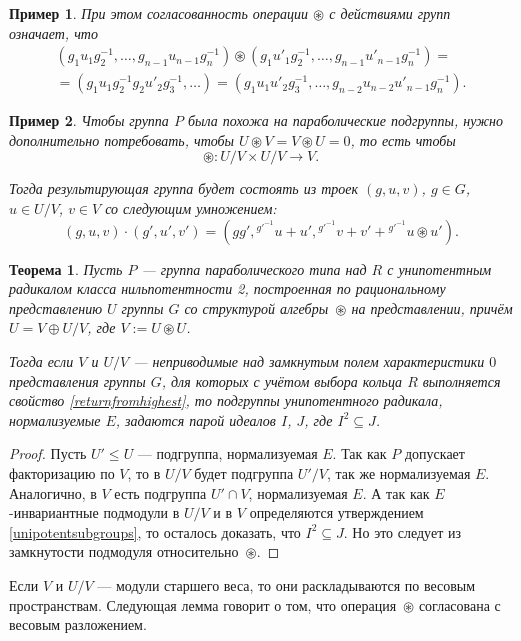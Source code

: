 \documentclass[12pt]{matmex-diploma}
\theoremstyle{mystyleni}
\theoremstyle{mystyle}
\newtheorem{thm}{Теорема}
\newtheorem{example}{Пример}
\newcommand\refb[1]{\ref{#1}}
\renewcommand{\le}{\leqslant}
\begin{document}
\begin{example}
При этом согласованность операции $\circledast$ с действиями групп означает, что
\begin{multline*}
(g_1 u_1 g_2^{-1}, \ldots, g_{n-1} u_{n-1} g_n^{-1}) \circledast (g_1 u'_1 g_2^{-1}, \ldots, g_{n-1} u'_{n-1} g_n^{-1}) 
= \\ =
(g_1 u_1 g_2^{-1} g_2 u'_2 g_3^{-1}, \ldots) = 
(g_1 u_1 u'_2 {g}_3^{-1}, \ldots, g_{n-2} u_{n-2} u'_{n-1} g_n^{-1}).
\end{multline*}
\end{example}

\begin{example}
Чтобы группа $P$ была похожа на параболические подгруппы, нужно дополнительно потребовать, чтобы $U \circledast V = V \circledast U = 0$, то есть чтобы
$$ \circledast : U\!/V \times U\!/V \to V.$$

Тогда результирующая группа будет состоять из троек $(g,u,v)$, $g \in G$, $u \in U\!/V$, $v \in V$ со следующим умножением:
$$
(g,u,v)\cdot (g',u',v') = (g g', {}^{g'^{-1}} u + u', {}^{g'^{-1}} v + v' + {}^{g'^{-1}} u \circledast u').
$$
\end{example}

\begin{thm}
Пусть $P$ --- группа параболического типа над $R$ с унипотентным радикалом класса нильпотентности 2, построенная по рациональному представлению $U$ группы $G$ со структурой алгебры~${\circledast}$ на представлении, причём  $U=V \oplus U\!/V$, где $V:=U\circledast U$.

Тогда если $V$ и $U\!/V$ --- неприводимые над замкнутым полем характеристики $0$ представления группы $G$, для которых с учётом выбора кольца $R$ выполняется свойство \refb{returnfromhighest}, то подгруппы унипотентного радикала, нормализуемые $E$, задаются парой идеалов $I$, $J$, где $I^2 \subseteq J$.
\end{thm}
\begin{proof}
Пусть $U'\le U$ --- подгруппа, нормализуемая $E$. Так как $P$ допускает факторизацию по $V$, то в $U\!/V$ будет подгруппа $U'\!/V$, так же нормализуемая $E$. Аналогично, в $V$ есть подгруппа $U' \cap V$, нормализуемая $E$. А так как $E$-инвариантные подмодули в $U\!/V$ и в $V$ определяются утверждением \refb{unipotentsubgroups}, то осталось доказать, что $I^2 \subseteq J$. Но это следует из замкнутости подмодуля относительно~${\circledast}$.
\end{proof}

Если $V$ и $U\!/V$ --- модули старшего веса, то они раскладываются по весовым пространствам. Следующая лемма говорит о том, что операция~${\circledast}$ согласована с весовым разложением.
\end{document}
